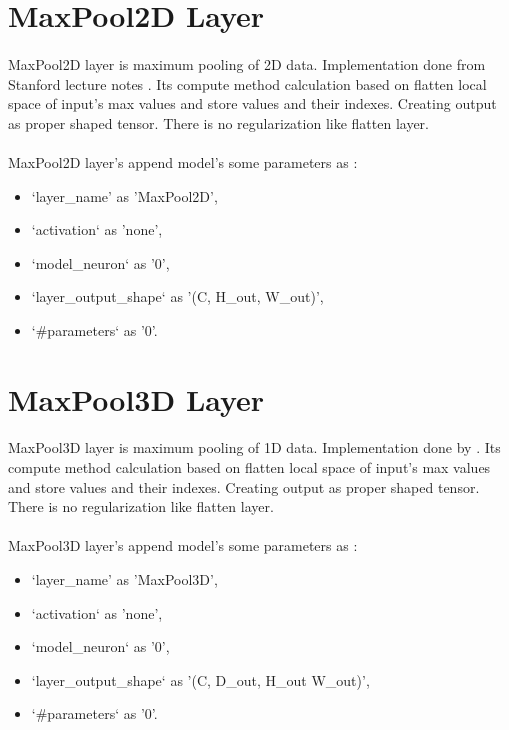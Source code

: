\documentclass[12pt]{report}
\begin{document}
\section{MaxPool2D Layer}

\paragraph{}
MaxPool2D layer is maximum pooling of 2D data. Implementation done from Stanford lecture notes \cite{cs231}. Its compute method calculation based on flatten local space of input's max values and store values and their indexes. Creating output as proper shaped tensor. There is no regularization like flatten layer.

\paragraph{}
MaxPool2D layer's append model's some parameters as :
\begin{itemize}
	\item `layer\_name' as 'MaxPool2D',
	\item `activation` as 'none',
	\item `model\_neuron` as '0',
	\item `layer\_output\_shape` as '(C, H\_out, W\_out)',
	\item `\#parameters` as '0'.
\end{itemize}



\section{MaxPool3D Layer}

\paragraph{}
MaxPool3D layer is maximum pooling of 1D data. Implementation done by \cite{MGK}. Its compute method calculation based on flatten local space of input's max values and store values and their indexes. Creating output as proper shaped tensor. There is no regularization like flatten layer.

\paragraph{}
MaxPool3D layer's append model's some parameters as :
\begin{itemize}
	\item `layer\_name' as 'MaxPool3D',
	\item `activation` as 'none',
	\item `model\_neuron` as '0',
	\item `layer\_output\_shape` as '(C, D\_out, H\_out W\_out)',
	\item `\#parameters` as '0'.
\end{itemize}
\end{document}
